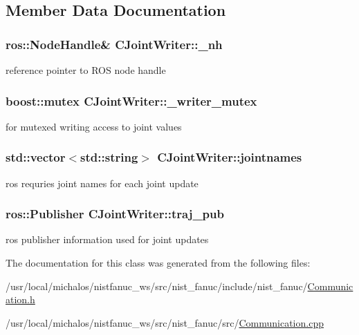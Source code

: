 \subsection{Member Data Documentation}
\hypertarget{classCJointWriter_af65e697d4e7fdfe1f17e16b47ab52817}{
\subsubsection[{\-\_\-nh}]{\setlength{\rightskip}{0pt plus 5cm}ros\-::\-Node\-Handle\& C\-Joint\-Writer\-::\-\_\-nh}}\label{classCJointWriter_af65e697d4e7fdfe1f17e16b47ab52817}
reference pointer to R\-O\-S node handle \hypertarget{classCJointWriter_a1f005dcb6f32e6d161026a6cdda5b66f}{
\subsubsection[{\-\_\-writer\-\_\-mutex}]{\setlength{\rightskip}{0pt plus 5cm}boost\-::mutex C\-Joint\-Writer\-::\-\_\-writer\-\_\-mutex\hspace{0.3cm}{\ttfamily [static]}}}\label{classCJointWriter_a1f005dcb6f32e6d161026a6cdda5b66f}
for mutexed writing access to joint values \hypertarget{classCJointWriter_a3aceb4ba37d60a52c34e486871bc8f58}{
\subsubsection[{jointnames}]{\setlength{\rightskip}{0pt plus 5cm}std\-::vector$<$std\-::string$>$ C\-Joint\-Writer\-::jointnames}}\label{classCJointWriter_a3aceb4ba37d60a52c34e486871bc8f58}
ros requries joint names for each joint update \hypertarget{classCJointWriter_a109841588bf726b430b82a509176bb0c}{
\subsubsection[{traj\-\_\-pub}]{\setlength{\rightskip}{0pt plus 5cm}ros\-::\-Publisher C\-Joint\-Writer\-::traj\-\_\-pub}}\label{classCJointWriter_a109841588bf726b430b82a509176bb0c}
ros publisher information used for joint updates 

The documentation for this class was generated from the following files\-:\begin{DoxyCompactItemize}
\item 
/usr/local/michalos/nistfanuc\-\_\-ws/src/nist\-\_\-fanuc/include/nist\-\_\-fanuc/\hyperlink{Communication_8h}{Communication.\-h}\item 
/usr/local/michalos/nistfanuc\-\_\-ws/src/nist\-\_\-fanuc/src/\hyperlink{Communication_8cpp}{Communication.\-cpp}\end{DoxyCompactItemize}
